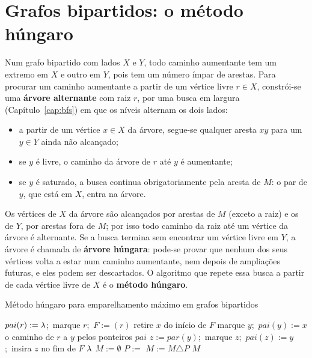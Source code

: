 \section{Grafos bipartidos: o método húngaro}\label{sec:hungaro}
Num grafo bipartido com lados $X$ e $Y$, todo caminho aumentante tem um extremo em $X$ e outro em $Y$, pois tem um número ímpar de arestas. Para procurar um caminho aumentante a partir de um vértice livre $r\in X$, constrói-se uma \textbf{árvore alternante} com raiz $r$, por uma busca em largura (Capítulo~\ref{cap:bfs}) em que os níveis alternam os dois lados:
\begin{itemize}
  \item a partir de um vértice $x\in X$ da árvore, segue-se qualquer aresta $xy$ para um $y\in Y$ ainda não alcançado;
  \item se $y$ é livre, o caminho da árvore de $r$ até $y$ é aumentante;
  \item se $y$ é saturado, a busca continua obrigatoriamente pela aresta de $M$: o par de $y$, que está em $X$, entra na árvore.
\end{itemize}
Os vértices de $X$ da árvore são alcançados por arestas de $M$ (exceto a raiz) e os de $Y$, por arestas fora de $M$; por isso todo caminho da raiz até um vértice da árvore é alternante. Se a busca termina sem encontrar um vértice livre em $Y$, a árvore é chamada de \textbf{árvore húngara}: pode-se provar que nenhum dos seus vértices volta a estar num caminho aumentante, nem depois de ampliações futuras, e eles podem ser descartados. O algoritmo que repete essa busca a partir de cada vértice livre de $X$ é o \textbf{método húngaro}.
\begin{pseudo}{Método húngaro para emparelhamento máximo em grafos bipartidos}
\begin{algorithmic}
 
  \State $pai(r):=\lambda$;\ marque $r$;\ $F:=(r)$
    \State retire $x$ do início de $F$
      \State marque $y$;\ $pai(y):=x$
       \State \Return o caminho de $r$ a $y$ pelos ponteiros $pai$  \EndIf
      \State $z:=par(y)$;\ marque $z$;\ $pai(z):=y$;\ insira $z$ no fim de $F$ 
    \EndFor
  \EndWhile
  \State \Return $\lambda$ 
\EndFunction
{}
  \State $M:=\emptyset$
    \State $P:=$  
     \State $M:=M\triangle P$ \EndIf
  \EndFor
  \State \Return $M$
\EndFunction
\end{algorithmic}
\end{pseudo}
